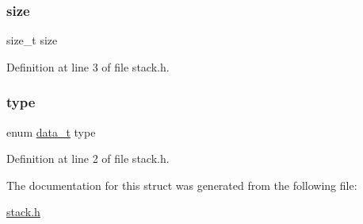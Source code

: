 \subsubsection{\texorpdfstring{size}{size}}
{\footnotesize\ttfamily size\+\_\+t size}



Definition at line 3 of file stack.\+h.

\mbox{\label{structstack__item_a0c6169f5c94682132bbbe974784559e6}} 
\subsubsection{\texorpdfstring{type}{type}}
{\footnotesize\ttfamily enum \mbox{\hyperlink{hashtable_8h_adb5f3584b941a8dc0fed6b7302b4b8eb}{data\+\_\+t}} type}



Definition at line 2 of file stack.\+h.



The documentation for this struct was generated from the following file\+:\begin{DoxyCompactItemize}
\item 
\mbox{\hyperlink{stack_8h}{stack.\+h}}\end{DoxyCompactItemize}
